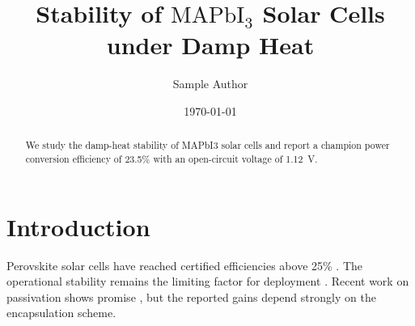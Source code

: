 \documentclass[11pt,a4paper]{article}
\title{Stability of $\mathrm{MAPbI_3}$ Solar Cells under Damp Heat}
\author{Sample Author}
\date{\today}
\begin{document}
\maketitle

\begin{abstract}
We study the damp-heat stability of MAPbI3 solar cells and report a champion
power conversion efficiency of 23.5\% with an open-circuit voltage of 1.12~V.
\end{abstract}

\section{Introduction}
Perovskite solar cells have reached certified efficiencies above 25\% \cite{smith2021}.
The operational stability remains the limiting factor for deployment \cite{li2020}.
Recent work on passivation shows promise \cite{chen2019}, but the reported gains
depend strongly on the encapsulation scheme.
\end{document}
